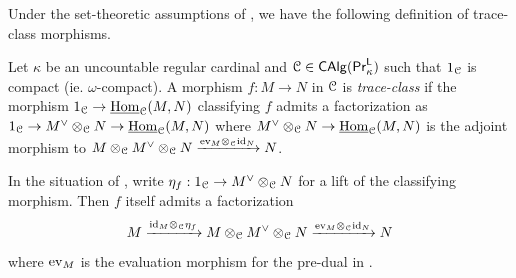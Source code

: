 Under the set-theoretic assumptions of , we have the following definition of trace-class morphisms. 
\begin{definition}\label{def: trace-class}
    Let $\kappa$ be an uncountable regular cardinal and $\EuScript{C}\in\mathsf{CAlg}(\mathsf{Pr}^{\mathsf{L}}_{\kappa})$ such that $1_{\EuScript{C}}$ is compact (ie. $\omega$-compact). A morphism $f:M\to N$ in $\EuScript{C}$ is \emph{trace-class} if the morphism $1_{\EuScript{C}}\to\underline{\mathrm{Hom}}_{\EuScript{C}}(M, N)$ classifying $f$ admits a factorization as $1_{\EuScript{C}}\to M^{\vee}\otimes_{\EuScript{C}}N\to\underline{\mathrm{Hom}}_{\EuScript{C}}(M, N)$ where $M^{\vee}\otimes_{\EuScript{C}}N\to \underline{\mathrm{Hom}}_{\EuScript{C}}(M, N)$ is the adjoint morphism to $M\otimes_{\EuScript{C}}M^{\vee}\otimes_{\EuScript{C}}N\xrightarrow{\mathrm{ev}_{M}\otimes_{\EuScript{C}}\mathrm{id}_{N}}N$. 
\end{definition}
\begin{remark}\label{rmk: trace-class factorization}
    In the situation of , write $\eta_{f}:1_{\EuScript{C}}\to M^{\vee}\otimes_{\EuScript{C}}N$ for a lift of the classifying morphism. Then $f$ itself admits a factorization
    \begin{equation}\label{eqn: trace-class factorization}
        M\xrightarrow{\mathrm{id}_{M}\otimes_{\EuScript{C}}\eta_{f}}M\otimes_{\EuScript{C}}M^{\vee}\otimes_{\EuScript{C}}N\xrightarrow{\mathrm{ev}_{M}\otimes_{\EuScript{C}}\mathrm{id}_{N}}N
    \end{equation}
    where $\mathrm{ev}_{M}$ is the evaluation morphism for the pre-dual in .
\end{remark}
